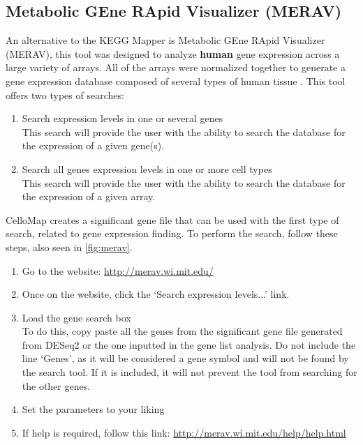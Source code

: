 \documentclass[11pt]{article}
\begin{document}
\subsection{Metabolic GEne RApid Visualizer (MERAV)\label{MERAV}}
An alternative to the \acrshort{KEGG} Mapper is Metabolic GEne RApid Visualizer (\acrshort{MERAV}), this tool was designed to analyze \textbf{human} gene expression across a large variety of arrays. All of the arrays were normalized together to generate a gene expression database composed of several types of human tissue \cite{shaul2015merav}.
This tool offers two types of searches:
\begin{enumerate}
\item Search expression levels in one or several genes\\
This search will provide the user with the ability to search the database for the expression of a given gene(s).
\item Search all genes expression levels in one or more cell types\\
This search will provide the user with the ability to search the database for the expression of a given array.
\end{enumerate}

CelloMap creates a significant gene file that can be used with the first type of search, related to gene expression finding. To perform the search, follow these steps, also seen in \autoref{fig:merav}.
\begin{enumerate}
\item Go to the website: \url{http://merav.wi.mit.edu/}
\item Once on the website, click the `Search expression levels...' link.
\item Load the gene search box\\
To do this, copy paste all the genes from the significant gene file generated from \acrshort{DESeq2} or the one inputted in the gene list analysis. Do not include the line `Genes', as it will be considered a gene symbol and will not be found by the search tool. If it is included, it will not prevent the tool from searching for the other genes.
\item Set the parameters to your liking
\item If help is required, follow this link: \url{http://merav.wi.mit.edu/help/help.html}
\end{enumerate}
\end{document}
